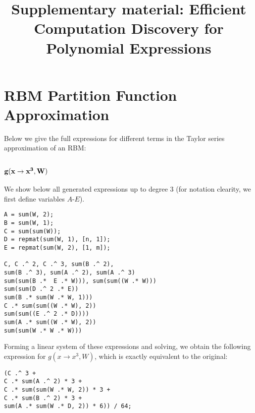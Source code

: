 \documentclass[]{article}
\title{Supplementary material: Efficient Computation Discovery for Polynomial Expressions}
\begin{document}
 

\maketitle

\section{RBM Partition Function Approximation}

Below we give the full expressions for different terms in the Taylor series approximation of an RBM:


\subsection{{$\bf g(x \rightarrow x^3, W)$}}

We show below all generated expressions up to degree 
$3$ (for notation clearity, we first define variables $A$-$E$).

\begin{lstlisting}
A = sum(W, 2);
B = sum(W, 1);
C = sum(sum(W));
D = repmat(sum(W, 1), [n, 1]);
E = repmat(sum(W, 2), [1, m]);

C, C .^ 2, C .^ 3, sum(B .^ 2), 
sum(B .^ 3), sum(A .^ 2), sum(A .^ 3)
sum(sum(B .*  E .* W))), sum(sum((W .* W)))
sum(sum(D .^ 2 .* E))
sum(B .* sum(W .* W, 1)))
C .* sum(sum((W .* W), 2))
sum(sum((E .^ 2 .* D)))) 
sum(A .* sum((W .* W), 2))
sum(sum(W .* W .* W)))
\end{lstlisting}

%
Forming a linear system of these expressions and solving, we obtain
the following expression for $g(x \rightarrow x^3, W)$, which is
exactly equivalent to the original:
\vspace{-0.3cm}
\begin{lstlisting}
(C .^ 3 + 
C .* sum(A .^ 2) * 3 +
C .* sum(sum(W .* W, 2)) * 3 +
C .* sum(B .^ 2) * 3 + 
sum(A .* sum(W .* D, 2)) * 6)) / 64;
\end{lstlisting}
\end{document}
